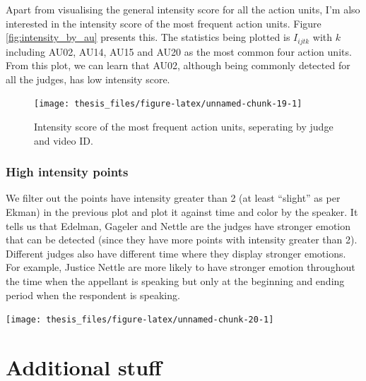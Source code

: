 \documentclass{monashthesis}
\begin{document}
Apart from visualising the general intensity score for all the action units, I'm also interested in the intensity score of the most frequent action units. Figure \ref{fig:intensity_by_au} presents this. The statistics being plotted is \(I_{ijtk}\) with \(k\) including AU02, AU14, AU15 and AU20 as the most common four action units. From this plot, we can learn that AU02, although being commonly detected for all the judges, has low intensity score.

\begin{figure}
\texttt{[image: thesis\_files/figure-latex/unnamed-chunk-19-1]} \caption{Intensity score of the most frequent action units, seperating by judge and video ID.\label{fig:intensity_by_au}}\label{fig:unnamed-chunk-19}
\end{figure}

\hypertarget{high-intensity-points}{%
\subsection{High intensity points}\label{high-intensity-points}}

We filter out the points have intensity greater than 2 (at least ``slight'' as per Ekman) in the previous plot and plot it against time and color by the speaker. It tells us that Edelman, Gageler and Nettle are the judges have stronger emotion that can be detected (since they have more points with intensity greater than 2). Different judges also have different time where they display stronger emotions. For example, Justice Nettle are more likely to have stronger emotion throughout the time when the appellant is speaking but only at the beginning and ending period when the respondent is speaking.

\texttt{[image: thesis\_files/figure-latex/unnamed-chunk-20-1]}

\appendix

\hypertarget{additional-stuff}{%
\chapter{Additional stuff}\label{additional-stuff}}
\end{document}

